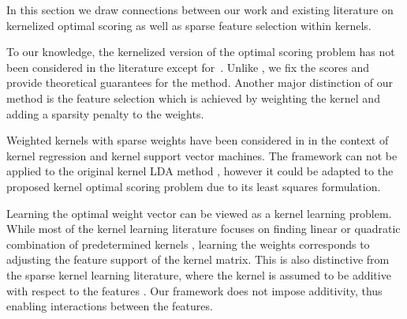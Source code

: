 \documentclass[twoside, onecolumn]{article}
\begin{document}
In this section we draw connections between our work and existing literature on kernelized optimal scoring as well as sparse feature selection within kernels.

To our knowledge, the kernelized version of the optimal scoring problem has not been considered in the literature except for~\cite{roth2000nonlinear}. Unlike \cite{roth2000nonlinear}, we fix the scores and provide theoretical guarantees for the method. Another major distinction of our method is the feature selection which is achieved by weighting the kernel and adding a sparsity penalty to the weights. 


 
 Weighted kernels with sparse weights have been considered in \cite{allen_automatic_2013, chen2017double} in the context of kernel regression and kernel support vector machines. The framework can not be applied to the original kernel LDA method \cite{mika_fisher_1999}, however it could be adapted to the proposed kernel optimal scoring problem due to its least squares formulation.
 
 Learning the optimal weight vector can be viewed as a kernel learning problem. While most of the kernel learning literature focuses on finding linear or quadratic combination of predetermined kernels \cite{bach2004multiple, sonnenburg2006large}, learning the weights corresponds to adjusting the feature support of the kernel matrix.  This is also distinctive from the sparse kernel learning literature, where the kernel is assumed to be additive with respect to the features \cite{bach2008consistency, sun2015learning}. Our framework does not impose additivity, thus enabling interactions between the features.
\end{document}
